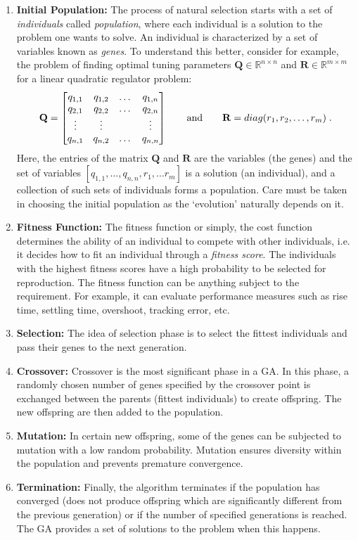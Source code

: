\begin{enumerate}
    \item \textbf{Initial Population: } The process of natural selection starts with a set of \textit{individuals} called \textit{population}, where each individual is a solution to the problem one wants to solve. An individual is characterized by a set of variables known as \textit{genes}. To understand this better, consider for example, the problem of finding optimal tuning parameters $\mathbf{Q} \in \mathbb{R}^{n \times n}$ and $\mathbf{R} \in \mathbb{R}^{m\times m}$ for a linear quadratic regulator problem:
    \begin{equation*}
        \mathbf{Q} = \begin{bmatrix} 
        q_{1,1} & q_{1,2} & \dots & q_{1,n}\\
        q_{2,1} & q_{2,2} & \dots & q_{2,n}\\
        \rowsvdots & \rowsvdots & &\rowsvdots\\
        q_{n,1} & q_{n,2} & \dots & q_{n,n}
        \end{bmatrix} \quad \quad \textup{and}  \quad \quad 
        \mathbf{R} = diag(r_1,r_2,\dots, r_m) \;.
    \end{equation*} 
    Here, the entries of the matrix $\mathbf{Q}$ and $\mathbf{R}$ are the variables (the genes) and the set of variables $[q_{1,1},\dots,{q}_{n,n}, r_1,...r_m ]$ is a solution (an individual), and a collection of such sets of individuals forms a population. Care must be taken in choosing the initial population as the `evolution' naturally depends on it. 
    \item \textbf{Fitness Function: } The fitness function or simply, the cost function determines the ability of an individual to compete with other individuals, i.e. it decides how to fit an individual through a \textit{fitness score}. The individuals with the highest fitness scores have a high probability to be selected for reproduction. The fitness function can be anything subject to the requirement. For example, it can evaluate performance measures such as rise time, settling time, overshoot, tracking error, etc. 
    \item \textbf{Selection: } The idea of selection phase is to select the fittest individuals and pass their genes to the next generation.
    \item \textbf{Crossover: } Crossover is the most significant phase in a GA. In this phase, a randomly chosen number of genes specified by the crossover point is exchanged between the parents (fittest individuals) to create offspring. The new offspring are then added to the population.
    \item \textbf{Mutation: } In certain new offspring, some of the genes can be subjected to mutation with a low random probability. Mutation ensures diversity within the population and prevents premature convergence.
    \item \textbf{Termination: } Finally, the algorithm terminates if the population has converged (does not produce offspring which are significantly different from the previous generation) or if the number of specified generations is reached. The GA provides a set of solutions to the problem when this happens.
\end{enumerate}

